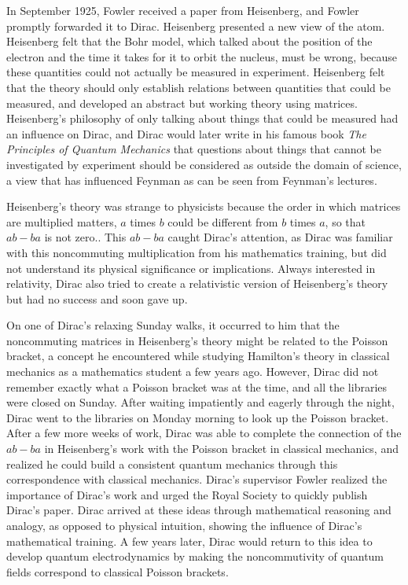 \documentclass[12pt, oneside, letterpaper, fleqn]{article}
\begin{document}
In September 1925, Fowler received a paper from Heisenberg, and Fowler
promptly forwarded it to Dirac. Heisenberg presented a new view of the
atom. Heisenberg felt that the Bohr model, which talked about the
position of the electron and the time it takes for it to orbit the
nucleus, must be wrong, because these quantities could not actually be
measured in experiment. Heisenberg felt that the theory should only
establish relations between quantities that could be measured, and
developed an abstract but working theory using matrices. Heisenberg's
philosophy of only talking about things that could be measured had an
influence on Dirac, and Dirac would later write in his famous book
\textit{The Principles of Quantum Mechanics} \cite{principles} that
questions about things that cannot be investigated by experiment should
be considered as outside the domain of science, a view that has
influenced Feynman as can be seen from Feynman's lectures.

Heisenberg's theory was strange to physicists because the order in which
matrices are multiplied matters, $a$ times $b$ could be different from
$b$ times $a$, so that $ab - ba$ is not zero..  This $ab - ba$ caught
Dirac's attention, as Dirac was familiar with this noncommuting
multiplication from his mathematics training, but did not understand its
physical significance or implications. Always interested in relativity,
Dirac also tried to create a relativistic version of Heisenberg's theory
but had no success and soon gave up.

On one of Dirac's relaxing Sunday walks, it occurred to him that the
noncommuting matrices in Heisenberg's theory might be related to the
Poisson bracket, a concept he encountered while studying Hamilton's
theory in classical mechanics as a mathematics student a few years ago.
However, Dirac did not remember exactly what a Poisson bracket was at
the time, and all the libraries were closed on Sunday. After waiting
impatiently and eagerly through the night, Dirac went to the libraries
on Monday morning to look up the Poisson bracket. After a few more weeks
of work, Dirac was able to complete the connection of the $ab - ba$ in
Heisenberg's work with the Poisson bracket in classical mechanics, and
realized he could build a consistent quantum mechanics through this
correspondence with classical mechanics. Dirac's supervisor Fowler
realized the importance of Dirac's work and urged the Royal Society to
quickly publish Dirac's paper. Dirac arrived at these ideas through
mathematical reasoning and analogy, as opposed to physical intuition,
showing the influence of Dirac's mathematical training. A few years
later, Dirac would return to this idea to develop quantum
electrodynamics by making the noncommutivity of quantum fields
correspond to classical Poisson brackets.
\end{document}
